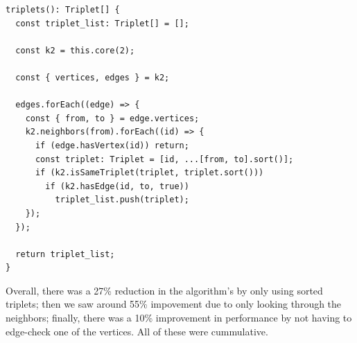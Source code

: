 \begin{verbatim}
triplets(): Triplet[] {
  const triplet_list: Triplet[] = [];

  const k2 = this.core(2);

  const { vertices, edges } = k2;

  edges.forEach((edge) => {
    const { from, to } = edge.vertices;
    k2.neighbors(from).forEach((id) => {
      if (edge.hasVertex(id)) return;
      const triplet: Triplet = [id, ...[from, to].sort()];
      if (k2.isSameTriplet(triplet, triplet.sort()))
        if (k2.hasEdge(id, to, true))
          triplet_list.push(triplet);
    });
  });

  return triplet_list;
}
\end{verbatim}

Overall, there was a 27\% reduction in the algorithm's by only using sorted triplets; then we saw around 55\% impovement
due to only looking through the neighbors; finally, there was a 10\% improvement in performance
by not having to edge-check one of the vertices.
All of these were cummulative.